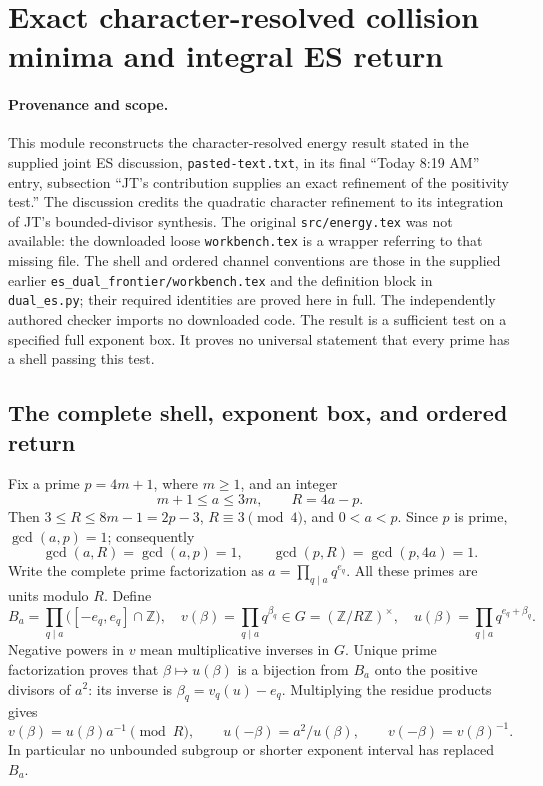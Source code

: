 \section{Exact character-resolved collision minima and integral ES return}
\label{sec:reconstructed-character-energy}

\paragraph{Provenance and scope.}
This module reconstructs the character-resolved energy result stated in the
supplied joint ES discussion, \texttt{pasted-text.txt}, in its final
``Today 8:19 AM'' entry, subsection ``JT's contribution supplies an exact
refinement of the positivity test.'' The discussion credits the quadratic
character refinement to its integration of JT's bounded-divisor synthesis.
The original \texttt{src/energy.tex} was not available: the downloaded loose
\texttt{workbench.tex} is a wrapper referring to that missing file.
The shell and ordered channel conventions are those in the supplied earlier
\texttt{es\_dual\_frontier/workbench.tex} and the definition block in
\texttt{dual\_es.py}; their required identities are proved here in full.
The independently authored checker imports no downloaded code.
The result is a sufficient test on a specified full exponent box. It proves
no universal statement that every prime has a shell passing this test.

\subsection{The complete shell, exponent box, and ordered return}
Fix a prime $p=4m+1$, where $m\geq1$, and an integer
\[
 m+1\leq a\leq3m,\qquad R=4a-p.
\]
Then $3\leq R\leq8m-1=2p-3$, $R\equiv3\pmod4$, and $0<a<p$.
Since $p$ is prime, $\gcd(a,p)=1$; consequently
\[
 \gcd(a,R)=\gcd(a,p)=1,\qquad
 \gcd(p,R)=\gcd(p,4a)=1.
\]
Write the complete prime factorization as $a=\prod_{q\mid a}q^{e_q}$.
All these primes are units modulo $R$. Define
\[
 B_a=\prod_{q\mid a}\bigl([-e_q,e_q]\cap\mathbb Z\bigr),
 \quad v(\beta)=\prod_{q\mid a}q^{\beta_q}\in
 G=(\mathbb Z/R\mathbb Z)^\times,
 \quad u(\beta)=\prod_{q\mid a}q^{e_q+\beta_q}.
\]
Negative powers in $v$ mean multiplicative inverses in $G$.
Unique prime factorization proves that $\beta\mapsto u(\beta)$ is a bijection
from $B_a$ onto the positive divisors of $a^2$: its inverse is
$\beta_q=v_q(u)-e_q$. Multiplying the residue products gives
\[
 v(\beta)=u(\beta)a^{-1}\pmod R,
 \qquad u(-\beta)=a^2/u(\beta),
 \qquad v(-\beta)=v(\beta)^{-1}.
\]
In particular no unbounded subgroup or shorter exponent interval has
replaced $B_a$.

